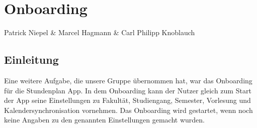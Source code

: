 \chapter{Onboarding}
Patrick Niepel \& Marcel Hagmann \& Carl Philipp Knoblauch

\section{Einleitung}
Eine weitere Aufgabe, die unsere Gruppe übernommen hat, war das Onboarding für die Stundenplan App. In dem Onboarding kann der Nutzer gleich zum Start der App seine Einstellungen zu Fakultät, Studiengang, Semester, Vorlesung und Kalendersynchronisation vornehmen. Das Onboarding wird gestartet, wenn noch keine Angaben zu den genannten Einstellungen gemacht wurden.


